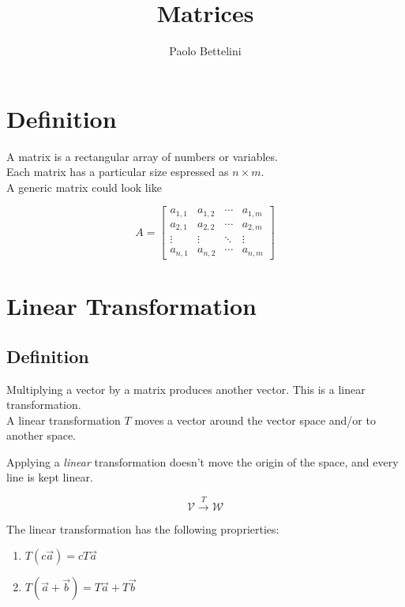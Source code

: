 \documentclass{article}
\title{Matrices}
\author{Paolo Bettelini}
\date{}
\begin{document}
\maketitle
\tableofcontents
\pagebreak

\section{Definition}

A matrix is a rectangular array of numbers or variables. \\
Each matrix has a particular size espressed as \(n \times m\). \\
A generic matrix could look like

\[
A = \begin{bmatrix} 
        a_{1,1} & a_{1,2} & \cdots & a_{1,m} \\
        a_{2,1} & a_{2,2} & \cdots & a_{2,m} \\
        \vdots  & \vdots  & \ddots & \vdots  \\
        a_{n,1} & a_{n,2} & \cdots & a_{n,m} 
    \end{bmatrix}
\]

\section{Linear Transformation}

\subsection{Definition}

Multiplying a vector by a matrix produces another vector. This is a linear transformation. \\
A linear transformation \(T\) moves a vector around the vector space and/or to another space.

Applying a \textit{linear} transformation doesn't move the origin of the space, and every line
is kept linear.

\[
    \mathcal{V} \xrightarrow{T} \mathcal{W}
\]

The linear transformation has the following proprierties:

\begin{enumerate}
    \item \(T(c\vec{a})=cT\vec{a}\)
    \item \(T(\vec{a} + \vec{b}) = T\vec{a} + T\vec{b}\)
\end{enumerate}
\end{document}
